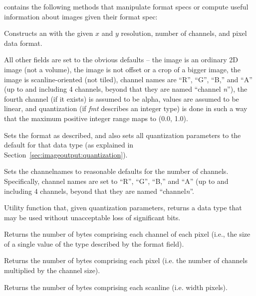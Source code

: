 \noindent \ImageSpec contains the following methods that
manipulate format specs or compute useful information about images given
their format spec:

Constructs an \ImageSpec with the given $x$ and $y$ resolution, number
of channels, and pixel data format.

All other fields are set to the obvious defaults -- the image is an
ordinary 2D image (not a volume), the image is not offset or a crop of a
bigger image, the image is scanline-oriented (not tiled), channel names
are ``R'', ``G'', ``B,'' and ``A'' (up to and including 4 channels,
beyond that they are named ``channel \emph{n}''), the fourth channel (if
it exists) is assumed to be alpha, values are assumed to be linear, and
quantization (if \emph{fmt} describes an integer type) is done in
such a way that the maximum positive integer range maps to (0.0, 1.0).
\apiend

Sets the format as described, and also sets all quantization parameters
to the default for that data type (as explained in 
Section~\ref{sec:imageoutput:quantization}).
\apiend

Sets the {\kw channelnames} to reasonable defaults for the number of
channels.  Specifically, channel names are set to ``R'', ``G'', ``B,''
and ``A'' (up to and including 4 channels, beyond that they are named
``channel\emph{n}''.
\apiend

Utility function that, given quantization parameters, returns a data
type that may be used without unacceptable loss of significant bits.
\apiend

Returns the number of bytes comprising each channel of each pixel (i.e.,
the size of a single value of the type described by the {\kw format} field).
\apiend

Returns the number of bytes comprising each pixel (i.e. the number of
channels multiplied by the channel size).
\apiend

Returns the number of bytes comprising each scanline (i.e. {\kw width} pixels).
\apiend

